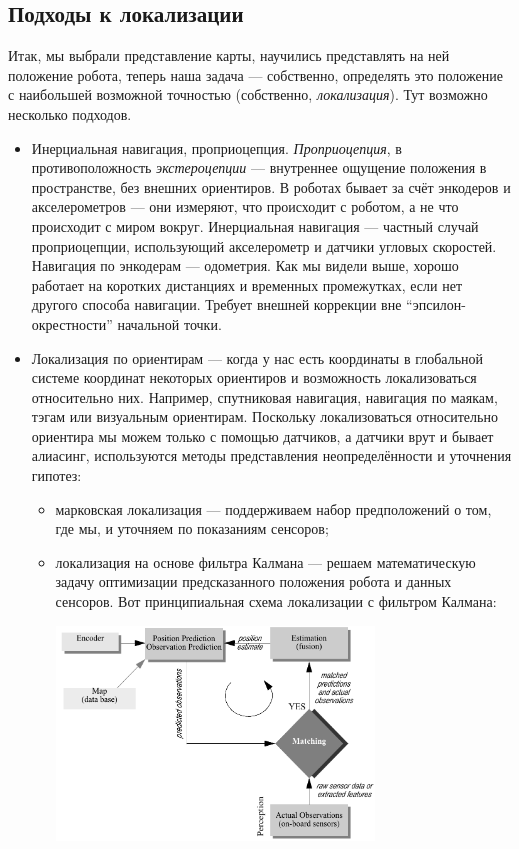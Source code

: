 \documentclass{../../text-style}
\begin{document}
\subsection{Подходы к локализации}

Итак, мы выбрали представление карты, научились представлять на ней положение робота, теперь наша задача --- собственно, определять это положение с наибольшей возможной точностью (собственно, \emph{локализация}).
Тут возможно несколько подходов.

\begin{itemize}
    \item Инерциальная навигация, проприоцепция.
        \emph{Проприоцепция}, в противоположность \emph{экстероцепции} --- внутреннее ощущение положения в пространстве, без внешних ориентиров.
        В роботах бывает за счёт энкодеров и акселерометров --- они измеряют, что происходит с роботом, а не что происходит с миром вокруг.
        Инерциальная навигация --- частный случай проприоцепции, использующий акселерометр и датчики угловых скоростей.
        Навигация по энкодерам --- одометрия.
        Как мы видели выше, хорошо работает на коротких дистанциях и временных промежутках, если нет другого способа навигации.
        Требует внешней коррекции вне \enquote{эпсилон-окрестности} начальной точки.
    \item Локализация по ориентирам --- когда у нас есть координаты в глобальной системе координат некоторых ориентиров и возможность локализоваться относительно них.
        Например, спутниковая навигация, навигация по маякам, тэгам или визуальным ориентирам.
        Поскольку локализоваться относительно ориентира мы можем только с помощью датчиков, а датчики врут и бывает алиасинг, используются методы представления неопределённости и уточнения гипотез:
    \begin{itemize}
        \item марковская локализация --- поддерживаем набор предположений о том, где мы, и уточняем по показаниям сенсоров;
        \item локализация на основе фильтра Калмана --- решаем математическую задачу оптимизации предсказанного положения робота и данных сенсоров.
            Вот принципиальная схема локализации с фильтром Калмана:
            \begin{center}
                \includegraphics[width=0.7\textwidth]{kalmanLocalization.png}

\end{center}
\end{itemize}
\end{itemize}
\end{document}
